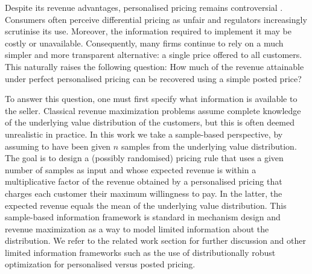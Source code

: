 \documentclass[11pt]{article}
\newcommand{\pk}[1]{\textcolor{ForestGreen}{\small({\sf Pieter: }{\sl #1})}}
\newcommand{\jvl}[1]{\textcolor{blue}{\small{\sf Johan: }{\sl #1}}}
\begin{document}
Despite its revenue advantages, personalised pricing remains controversial \cite{seele2021mapping}. Consumers often perceive differential pricing as unfair and regulators increasingly scrutinise its use. Moreover, the information required to implement it may be costly or unavailable. Consequently, many firms continue to rely on a much simpler and more transparent alternative: a single price offered to all customers. This naturally raises the following question: How much of the revenue attainable under perfect personalised pricing can be recovered using a simple posted price?

To answer this question, one must first specify what information is available to the seller.
Classical revenue maximization problems assume complete knowledge of the underlying value distribution of the customers, but this is often deemed unrealistic in practice. 
In this work we take a sample-based perspective, by assuming to have been given $n$ samples from the underlying value distribution. 
The goal is to design a (possibly randomised) pricing rule that uses a given number of samples as input and whose expected revenue is within a multiplicative factor of the revenue obtained by a personalised pricing that charges each customer their maximum willingness to pay.
In the latter, the expected revenue equals the mean of the underlying value distribution.
This sample-based information framework is standard in mechanism design and revenue maximization as a way to model limited information about the distribution. We refer to the related work section for further discussion and other limited information frameworks such as the use of distributionally robust optimization \cite{elmachtoub2021value} for personalised versus posted pricing.


\end{document}
